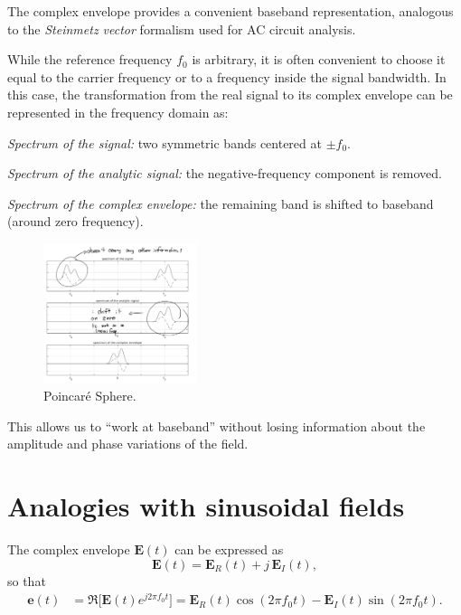 The complex envelope provides a convenient baseband representation, analogous to the \emph{Steinmetz vector} formalism used for AC circuit analysis.





While the reference frequency $f_0$ is arbitrary, it is often convenient to choose it equal to the carrier frequency or to a frequency inside the signal bandwidth.  
In this case, the transformation from the real signal to its complex envelope can be represented in the frequency domain as:

\begin{center}
\textit{Spectrum of the signal:} two symmetric bands centered at $\pm f_0$.

\textit{Spectrum of the analytic signal:} the negative-frequency component is removed.

\textit{Spectrum of the complex envelope:} the remaining band is shifted to baseband (around zero frequency).
\end{center}

\begin{figure}[h]
    \centering
    \includegraphics[width=0.4\textwidth]{Pictures/ComplexEnvelope.png}
    \caption{Poincaré Sphere.}
\end{figure}

This allows us to “work at baseband” without losing information about the amplitude and phase variations of the field.


\newpage
\section{Analogies with sinusoidal fields}

The complex envelope $\mathbf{E}(t)$ can be expressed as
\[
\mathbf{E}(t) = \mathbf{E}_R(t) + j\,\mathbf{E}_I(t),
\]
so that
\begin{align}
    \mathbf{e}(t)
    &= \Re\!\big[\mathbf{E}(t)e^{j2\pi f_0 t}\big]
     = \mathbf{E}_R(t)\cos(2\pi f_0 t)
     - \mathbf{E}_I(t)\sin(2\pi f_0 t).
\end{align}

